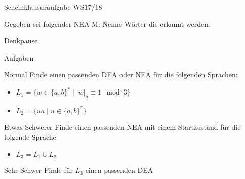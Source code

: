 {
\begin{frame}{Scheinklausuraufgabe WS17/18}
    \begin{alertblock} {Gegeben sei folgender NEA M:}
        Nenne Wörter die erkannt werden.\\
    \end{alertblock}
\end{frame}
}

{
\begin{frame}{Denkpause}
    \footnotesize
    \begin{alertblock}{Aufgaben}
    \end{alertblock}
    \begin{block}{Normal}
        Finde einen passenden DEA oder NEA für die folgenden Sprachen:
        \begin{itemize}
            \item $L_1 = \{w \in \{a,b\}^* \mid |w|_a \equiv 1 \mod{3}\}$
            \item $L_2 = \{ua\mid u \in \{a,b\}^*\}$
        \end{itemize}
    \end{block}
    \begin{block}{Etwas Schwerer}
        Finde einen passenden NEA mit \alert{einem Startzustand} für die folgende Sprache
        \begin{itemize}
            \item $L_3 = L_1 \cup L_2$
        \end{itemize}
    \end{block}
    \begin{block}{Sehr Schwer}
        Finde für $L_3$ einen passenden DEA
    \end{block}
\end{frame}
}

